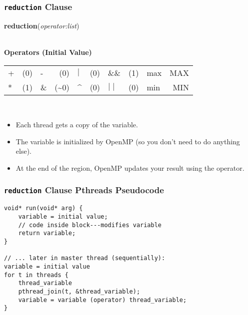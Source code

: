 \documentclass[aspectratio=43]{beamer}
\newenvironment{changemargin}[1]{%
  \begin{list}{}{%
    \setlength{\topsep}{0pt}%
    \setlength{\leftmargin}{#1}%
    \setlength{\rightmargin}{1em}
    \setlength{\listparindent}{\parindent}%
    \setlength{\itemindent}{\parindent}%
    \setlength{\parsep}{\parskip}%
  }%
  \item[]}{\end{list}}
\begin{document}
\begin{frame}
  \frametitle{{\tt reduction} Clause}

  \begin{changemargin}{2.5cm}
  \begin{center}
    {\bf reduction}({\it operator:list})
  \end{center}
  ~\\

  {\bf Operators (Initial Value)}
  \begin{center}
    \begin{tabular}{l r | l r | l r | l r | l r}
      + & (0) & -  &  (0) &    $\mid$ & (0) & \&\& & (1) & max & MAX\\
      * & (1) & \& & (\~{}0) & \^{} & (0) &   $\mid\mid$ & (0) & min & MIN\\ 
    \end{tabular}
  \end{center}
  ~\\[1em]
  
  \begin{itemize}
    \item Each thread gets a  copy of the variable.
    \item The variable is initialized by OpenMP (so you don't need to do anything else).
    \item At the end of the region, OpenMP updates your result using the operator.
  \end{itemize}
  \end{changemargin}

\end{frame}

\begin{frame}[fragile]
  \frametitle{{\tt reduction} Clause Pthreads Pseudocode}

  \begin{changemargin}{2cm}
  \begin{lstlisting}
void* run(void* arg) {
    variable = initial value;
    // code inside block---modifies variable
    return variable;
}

// ... later in master thread (sequentially):
variable = initial value
for t in threads {
    thread_variable
    pthread_join(t, &thread_variable);
    variable = variable (operator) thread_variable;
}
  \end{lstlisting}
  \end{changemargin}

\end{frame}
\end{document}
